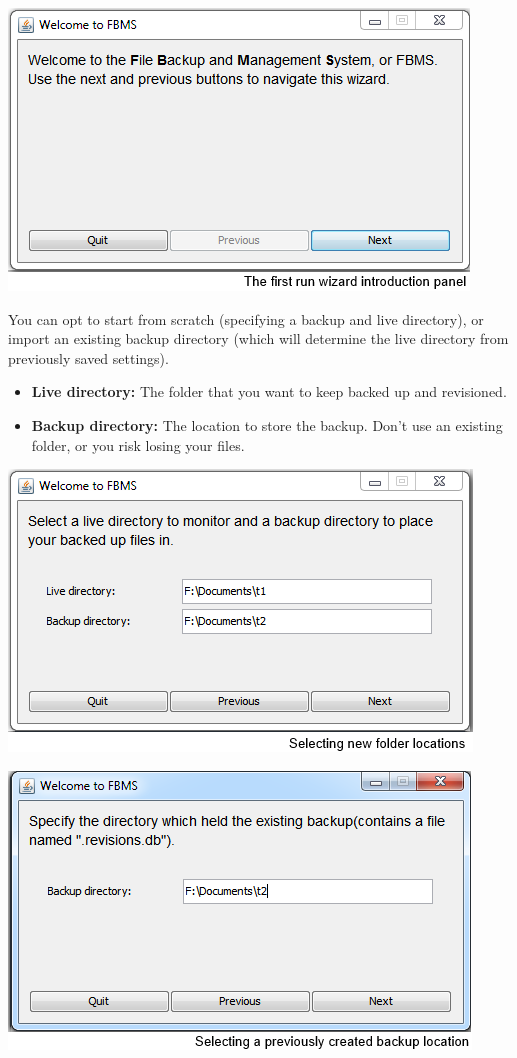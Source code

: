 \documentclass[12pt,a4paper]{article}
\begin{document}
\includegraphics{images/1-firstRunIntro.png}
  
You can opt to start from scratch (specifying a backup and live directory), or import an existing backup directory (which will determine the live directory from previously saved settings).

\begin{itemize}
\item \textbf{Live directory:} The folder that you want to keep backed up and revisioned.
\item \textbf{Backup directory:} The location to store the backup. Don't use an existing folder, or you risk losing your files.
\end{itemize}

\includegraphics{images/2-newBackup.png}

\includegraphics{images/3-oldBackup.png}
\end{document}
